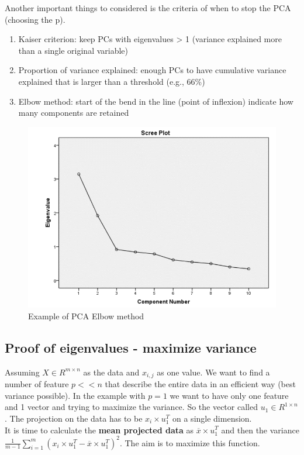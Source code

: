 Another important things to considered is the criteria of when to stop the PCA (choosing the p).
\begin{enumerate}
    \item Kaiser criterion: keep PCs with eigenvalues > 1 (variance explained more than a single original variable)
    \item Proportion of variance explained: enough PCs to have cumulative variance explained that is larger than a threshold (e.g., 66\%)
    \item  Elbow method: start of the bend in the line (point of inflexion) indicate how many components are retained
\end{enumerate}
\begin{figure}[H]
    \centering
    \includegraphics[scale=0.5]{images/DimRed/PCA7.png}
    \caption{Example of PCA Elbow method}
    \label{fig:enter-label}
\end{figure}

\subsection{Proof of eigenvalues - maximize variance}
Assuming $X \in R^{m \times n}$ as the data and $x_{i,j}$ as one value.
We want to find a number of feature $p << n$ that describe the entire data in an efficient way (best variance possible). In the example with $p=1$ we want to have only one feature and 1 vector and trying to maximize the variance. 
So the vector called $u_1 \in R^{1 \times n}$. The projection on the data has to be $ x_i \times u_1^T$ on a single dimension.\\
It is time to calculate the \textbf{mean projected data} as $ \overline{x} \times u_1^T $ and then the variance $ \frac{1}{m-1} \sum\limits_{i=1}^m (x_i \times u_1^T - \overline{x} \times u_1^T)^2$. The aim is to maximize this function.\\

